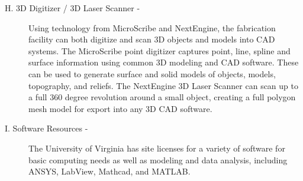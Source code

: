 \begin{description}
\item[H. 3D Digitizer / 3D Laser Scanner - ]

Using technology from MicroScribe and NextEngine, the fabrication facility can both digitize and scan 3D objects and models into CAD systems. The MicroScribe point digitizer captures point, line, spline and surface information using common 3D modeling and CAD software. These can be used to generate surface and solid models of objects, models, topography, and reliefs. The NextEngine 3D Laser Scanner can scan up to a full 360 degree revolution around a small object, creating a full polygon mesh model for export into any 3D CAD software. 

\item[I. Software Resources - ]
The University of Virginia has site licenses for a variety of software for basic computing needs as well as modeling and data analysis, including ANSYS, LabView, Mathcad, and MATLAB. 

\end{description}